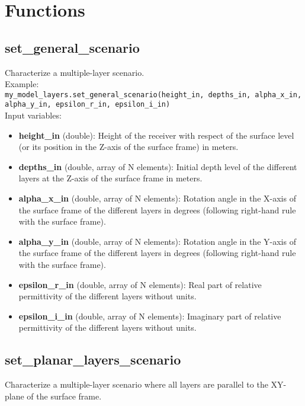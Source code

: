 \section{Functions}

\subsection{set\_general\_scenario}

Characterize a multiple-layer scenario.\\

Example:\\

\texttt{my\_model\_layers.set\_general\_scenario(height\_in, depths\_in, alpha\_x\_in, alpha\_y\_in, epsilon\_r\_in, epsilon\_i\_in)}\\

Input variables:
\begin{itemize}
\item {\bf height\_in} (double): Height of the receiver with respect of the surface level (or its position in the Z-axis of the surface frame) in meters.
\item {\bf depths\_in} (double, array of N elements): Initial depth level of the different layers at the Z-axis of the surface frame in meters.
\item {\bf alpha\_x\_in} (double, array of N elements): Rotation angle in the X-axis of the surface frame of the different layers in degrees (following right-hand rule with the surface frame).
\item {\bf alpha\_y\_in} (double, array of N elements): Rotation angle in the Y-axis of the surface frame of the different layers in degrees (following right-hand rule with the surface frame).
\item {\bf epsilon\_r\_in} (double, array of N elements): Real part of relative permittivity of the different layers without units.
\item {\bf epsilon\_i\_in} (double, array of N elements): Imaginary part of relative permittivity of the different layers without units.
\end{itemize}


\subsection{set\_planar\_layers\_scenario}

Characterize a multiple-layer scenario where all layers are parallel to the XY-plane of the surface frame.\\

